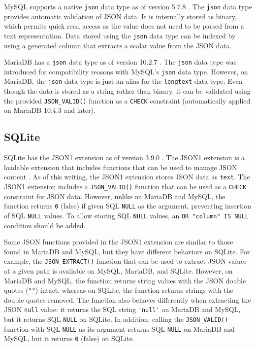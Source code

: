MySQL supports a native \verb|json| data type as of version 5.7.8
\cite{mysql:json}. The \verb|json| data type provides automatic validation of
JSON data. It is internally stored as binary, which permits quick read access
as the value does not need to be parsed from a text representation. Data stored
using the \verb|json| data type can be indexed by using a generated column that
extracts a scalar value from the JSON data.

MariaDB has a \verb|json| data type as of version 10.2.7 \cite{mariadb:json}.
The \verb|json| data type was introduced for compatibility reasons with MySQL's
\verb|json| data type. However, on MariaDB, the \verb|json| data type is just
an alias for the \verb|longtext| data type. Even though the data is stored as a
string rather than binary, it can be validated using the provided
\verb|JSON_VALID()| function as a \verb|CHECK| constraint (automatically
applied on MariaDB 10.4.3 and later).

\subsection{SQLite}

SQLite has the JSON1 extension as of version 3.9.0 \cite{sqlite:3.9.0}. The
JSON1 extension is a loadable extension that includes functions that can be
used to manage JSON content \cite{sqlite:json1}. As of this writing, the JSON1
extension stores JSON data as \verb|text|. The JSON1 extension includes a
\verb|JSON_VALID()| function that can be used as a \verb|CHECK| constraint for
JSON data. However, unlike on MariaDB and MySQL, the function returns \verb|0|
(false) if given SQL \verb|NULL| as the argument, preventing insertion of SQL
\verb|NULL| values. To allow storing SQL \verb|NULL| values, an
\verb|OR "column" IS NULL| condition should be added.

Some JSON functions provided in the JSON1 extension are similar to those found
in MariaDB and MySQL, but they have different behaviors on SQLite. For example,
the \verb|JSON_EXTRACT()| function that can be used to extract JSON values at a
given path is available on MySQL, MariaDB, and SQLite. However, on MariaDB and
MySQL, the function returns string values with the JSON double quotes
(\verb|""|) intact, whereas on SQLite, the function returns strings with the
double quotes removed. The function also behaves differently when extracting
the JSON \verb|null| value: it returns the SQL string \verb|'null'| on MariaDB
and MySQL, but it returns SQL \verb|NULL| on SQLite. In addition, calling the
\verb|JSON_VALID()| function with SQL \verb|NULL| as its argument returns SQL
\verb|NULL| on MariaDB and MySQL, but it returns \verb|0| (false) on SQLite.

